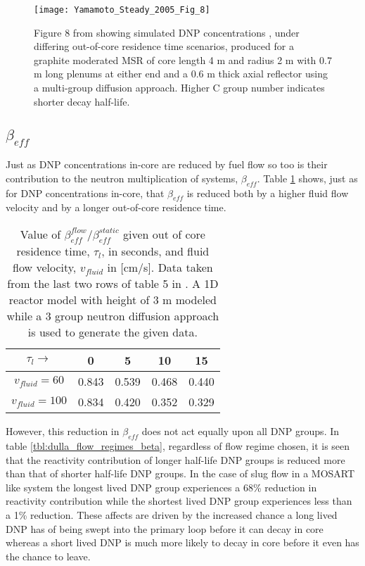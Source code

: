 \documentclass[review]{elsarticle}
\begin{document}
\begin{figure}[h]
   \centering
   \texttt{[image: Yamamoto\_Steady\_2005\_Fig\_8]}
   \caption{Figure 8 from \cite{yamamoto_steady_2005} showing simulated DNP concentrations
    , under differing out-of-core residence time scenarios, produced for
    a graphite moderated MSR of core length 4 m and radius 2 m with 0.7 m long 
    plenums at either end and a 0.6 m thick axial reflector using a
    multi-group diffusion approach. Higher C group number indicates shorter decay half-life.}
   \label{fig:yamamoto_transit_time}
\end{figure}

\subsection{$\beta_{eff}$} \label{ssec:beta}
Just as DNP concentrations in-core are reduced by fuel flow so too is their
contribution to the neutron multiplication of systems, $\beta_{eff}$.
Table \ref{tbl:mattioda_beta_reduction} shows, just as for DNP concentrations
in-core, that $\beta_{eff}$ is reduced both by a higher fluid flow velocity and
by a longer out-of-core residence time.

\begin{table}[h]
    \caption{Value of $\beta_{eff}^{flow}/\beta_{eff}^{static}$ given out of
        core residence time, $\tau_{l}$, in seconds, 
        and fluid flow velocity, $v_{fluid}$ in [cm/s]. Data taken from
        the last two rows of table 5
        in \cite{mattioda_effective_2000}. A 1D reactor model with height of 3 m
        modeled while a 3 group neutron diffusion approach is used to generate
        the given data.} 
    \label{tbl:mattioda_beta_reduction}
    \begin{center}
        \begin{tabular}{|c|c|c|c|c|}
            \hline
            $\tau_{l}\rightarrow$ & 0 & 5 & 10 & 15 \\
            \hline
            $v_{fluid} = 60$ & 0.843 & 0.539 & 0.468 & 0.440 \\
            \hline
            $v_{fluid} = 100$ & 0.834 & 0.420 & 0.352 & 0.329 \\
            \hline
        \end{tabular}
    \end{center}
\end{table}

However,
this reduction in $\beta_{eff}$ does not act equally upon all DNP groups. In table
\ref{tbl:dulla_flow_regimes_beta}, regardless of flow regime chosen, it is seen
that the reactivity contribution of longer half-life DNP groups is
reduced more than that of shorter half-life DNP groups. In the case of slug
flow in a MOSART like system the longest lived DNP group experiences a 68\%
reduction in reactivity contribution while the shortest lived DNP group
experiences less than a 1\% reduction. These affects are driven by the increased
chance a long lived DNP has of being swept into the primary loop before it can
decay in core whereas a short lived DNP is much more likely to decay in core
before it even has the chance to leave.
\end{document}

